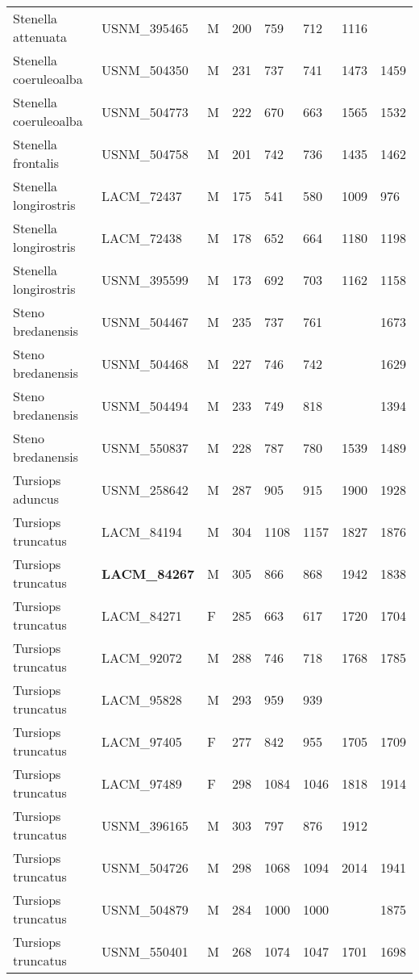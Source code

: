 \begin{longtable}{|p{1in}p{1in}p{.15in}p{.4in}p{.4in}p{.5in}p{.5in}p{.75in}|}
  Stenella attenuata & USNM\_395465 & M & 200 & 759 & 712 & 1116 &  \\ 
  Stenella coeruleoalba & USNM\_504350 & M & 231 & 737 & 741 & 1473 & 1459 \\ 
  Stenella coeruleoalba & USNM\_504773 & M & 222 & 670 & 663 & 1565 & 1532 \\ 
  Stenella frontalis & USNM\_504758 & M & 201 & 742 & 736 & 1435 & 1462 \\ 
  Stenella longirostris & LACM\_72437 & M & 175 & 541 & 580 & 1009 & 976 \\ 
  Stenella longirostris & LACM\_72438 & M & 178 & 652 & 664 & 1180 & 1198 \\ 
  Stenella longirostris & USNM\_395599 & M & 173 & 692 & 703 & 1162 & 1158 \\ 
  Steno bredanensis & USNM\_504467 & M & 235 & 737 & 761 &  & 1673 \\ 
  Steno bredanensis & USNM\_504468 & M & 227 & 746 & 742 &  & 1629 \\ 
  Steno bredanensis & USNM\_504494 & M & 233 & 749 & 818 &  & 1394 \\ 
  Steno bredanensis & USNM\_550837 & M & 228 & 787 & 780 & 1539 & 1489 \\ 
  Tursiops aduncus & USNM\_258642 & M & 287 & 905 & 915 & 1900 & 1928 \\ 
  Tursiops truncatus & LACM\_84194 & M & 304 & 1108 & 1157 & 1827 & 1876 \\ 
  Tursiops truncatus & \textbf{ LACM\_84267 } & M & 305 & 866 & 868 & 1942 & 1838 \\ 
  Tursiops truncatus & LACM\_84271 & F & 285 & 663 & 617 & 1720 & 1704 \\ 
  Tursiops truncatus & LACM\_92072 & M & 288 & 746 & 718 & 1768 & 1785 \\ 
  Tursiops truncatus & LACM\_95828 & M & 293 & 959 & 939 &  &  \\ 
  Tursiops truncatus & LACM\_97405 & F & 277 & 842 & 955 & 1705 & 1709 \\ 
  Tursiops truncatus & LACM\_97489 & F & 298 & 1084 & 1046 & 1818 & 1914 \\ 
  Tursiops truncatus & USNM\_396165 & M & 303 & 797 & 876 & 1912 &  \\ 
  Tursiops truncatus & USNM\_504726 & M & 298 & 1068 & 1094 & 2014 & 1941 \\ 
  Tursiops truncatus & USNM\_504879 & M & 284 & 1000 & 1000 &  & 1875 \\ 
  Tursiops truncatus & USNM\_550401 & M & 268 & 1074 & 1047 & 1701 & 1698 \\ 

\end{longtable}
